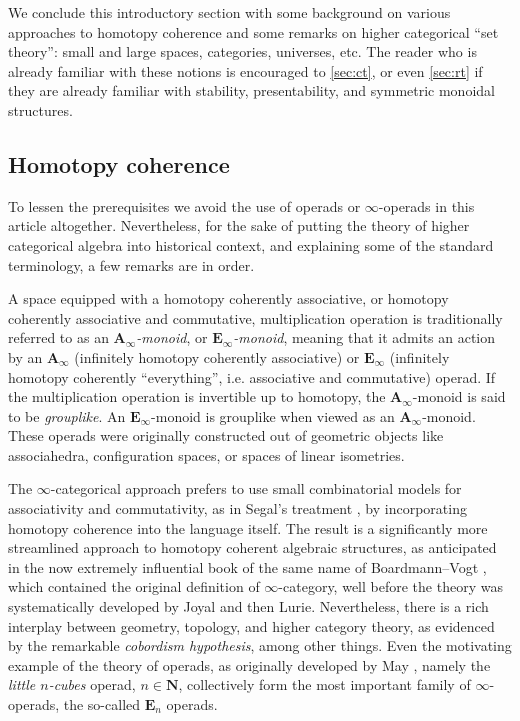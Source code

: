 \documentclass[12pt]{article}
\theoremstyle{definition}
\renewcommand{\AA}{\mathbf{A}}
\newcommand{\EE}{\mathbf{E}}
\newcommand{\NN}{\mathbf{N}}
\renewcommand{\i}{\infty}
\begin{document}
We conclude this introductory section with some background on various approaches to homotopy coherence and some remarks on higher categorical ``set theory'': small and large spaces, categories, universes, etc.
The reader who is already familiar with these notions is encouraged to \autoref{sec:ct}, or even \autoref{sec:rt} if they are already familiar with stability, presentability, and symmetric monoidal structures.

\subsection{Homotopy coherence}

To lessen the prerequisites we avoid the use of operads or $\infty$-operads in this article altogether.
Nevertheless, for the sake of putting the theory of higher categorical algebra into historical context, and explaining some of the standard terminology, a few remarks are in order.

A space equipped with a homotopy coherently associative, or homotopy coherently associative and commutative, multiplication operation is traditionally referred to as an {\em $\AA_\i$-monoid}, or {\em $\EE_\i$-monoid}, meaning that it admits an action by an $\AA_\i$ (infinitely homotopy coherently associative) or $\EE_\i$ (infinitely homotopy coherently ``everything'', i.e. associative and commutative) operad. If the multiplication operation is invertible up to homotopy, the $\AA_\i$-monoid is said to be {\em grouplike}.
An $\EE_\i$-monoid is grouplike when viewed as an $\AA_\i$-monoid.
These operads were originally constructed out of geometric objects like associahedra, configuration spaces, or spaces of linear isometries.

The $\i$-categorical approach prefers to use small combinatorial models for associativity and commutativity, as in Segal's treatment \cite{Seg74}, by incorporating homotopy coherence into the language itself.
The result is a significantly more streamlined approach to homotopy coherent algebraic structures, as anticipated in the now extremely influential book of the same name of Boardmann--Vogt \cite{BV}, which contained the original definition of $\i$-category, well before the theory was systematically developed by Joyal and then Lurie.
Nevertheless, there is a rich interplay between geometry, topology, and higher category theory, as evidenced by the remarkable {\em cobordism hypothesis}, among other things.
Even the motivating example of the theory of operads, as originally developed by May \cite{May}, namely the {\em little $n$-cubes} operad, $n\in\NN$, collectively form the most important family of $\i$-operads, the so-called $\EE_n$ operads.
\end{document}
